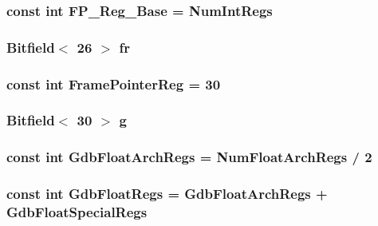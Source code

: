 \label{namespaceMipsISA_a3233167b16e632eb21dbd7f259511ddd}
\hypertarget{namespaceMipsISA_a833d6deee31e8a9398618efdc22effde}{
\subsubsection[{FP\_\-Reg\_\-Base}]{\setlength{\rightskip}{0pt plus 5cm}const int {\bf FP\_\-Reg\_\-Base} = {\bf NumIntRegs}}}
\label{namespaceMipsISA_a833d6deee31e8a9398618efdc22effde}
\hypertarget{namespaceMipsISA_a7943db9a4d094cbf5760f498bc9b5160}{
\subsubsection[{fr}]{\setlength{\rightskip}{0pt plus 5cm}Bitfield$<$ 26 $>$ {\bf fr}}}
\label{namespaceMipsISA_a7943db9a4d094cbf5760f498bc9b5160}
\hypertarget{namespaceMipsISA_aabd6fa5889c9ccc124dfd4a984046f6f}{
\subsubsection[{FramePointerReg}]{\setlength{\rightskip}{0pt plus 5cm}const int {\bf FramePointerReg} = 30}}
\label{namespaceMipsISA_aabd6fa5889c9ccc124dfd4a984046f6f}
\hypertarget{namespaceMipsISA_adaa97a14cfbb88776805aa7e304aa2ce}{
\subsubsection[{g}]{\setlength{\rightskip}{0pt plus 5cm}Bitfield$<$ 30 $>$ {\bf g}}}
\label{namespaceMipsISA_adaa97a14cfbb88776805aa7e304aa2ce}
\hypertarget{namespaceMipsISA_a5dec1bb388f2473cc5ae43e313d797eb}{
\subsubsection[{GdbFloatArchRegs}]{\setlength{\rightskip}{0pt plus 5cm}const int {\bf GdbFloatArchRegs} = {\bf NumFloatArchRegs} / 2}}
\label{namespaceMipsISA_a5dec1bb388f2473cc5ae43e313d797eb}
\hypertarget{namespaceMipsISA_a2cc3ae8e0cc393b8de3b4c2f3677bdd0}{
\subsubsection[{GdbFloatRegs}]{\setlength{\rightskip}{0pt plus 5cm}const int {\bf GdbFloatRegs} = {\bf GdbFloatArchRegs} + {\bf GdbFloatSpecialRegs}}}
